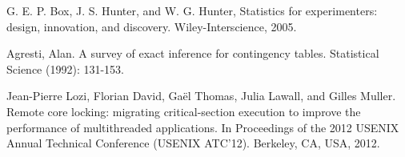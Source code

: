 \begin{thebibliography}{4}
 G. E. P. Box, J. S. Hunter, and W. G. Hunter, Statistics for experimenters: design, innovation, and discovery. Wiley-Interscience, 2005.

 Agresti, Alan. A survey of exact inference for contingency tables. Statistical Science (1992): 131-153.

 Jean-Pierre Lozi, Florian David, Ga\"{e}l Thomas, Julia Lawall, and Gilles Muller. Remote core locking: migrating critical-section execution to improve the performance of multithreaded applications. In Proceedings of the 2012 USENIX Annual Technical Conference (USENIX ATC'12). Berkeley, CA, USA, 2012.

\end{thebibliography}